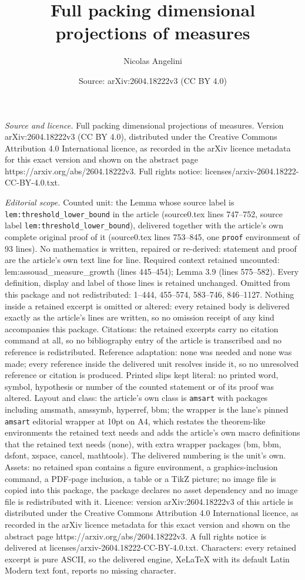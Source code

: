 \documentclass[10pt,a4paper]{amsart}
\title[Full packing dimensional projections of measures]{Full packing dimensional projections of measures}
\author{Nicolas Angelini}
\date{Source: arXiv:2604.18222v3 (CC BY 4.0)}
\begin{document}
\maketitle

\noindent\emph{Source and licence.} Full packing dimensional projections of measures. Version arXiv:2604.18222v3 (CC BY 4.0), distributed under the Creative Commons Attribution 4.0 International licence, as recorded in the arXiv licence metadata for this exact version and shown on the abstract page https://arxiv.org/abs/2604.18222v3. Full rights notice: licenses/arxiv-2604.18222-CC-BY-4.0.txt.\par\smallskip

\noindent\textit{Editorial scope.} Counted unit: the Lemma whose source label is \texttt{lem:threshold\_lower\_bound} in the article (source0.tex lines 747--752, source label \texttt{lem:threshold\_lower\_bound}), delivered together with the article's own complete original proof of it (source0.tex lines 753--845, one \texttt{proof} environment of 93 lines). No mathematics is written, repaired or re-derived: statement and proof are the article's own text line for line. Required context retained uncounted: lem:assouad\_measure\_growth (lines 445--454); Lemma 3.9 (lines 575--582). Every definition, display and label of those lines is retained unchanged. Omitted from this package and not redistributed: 1--444, 455--574, 583--746, 846--1127. Nothing inside a retained excerpt is omitted or altered: every retained body is delivered exactly as the article's lines are written, so no omission receipt of any kind accompanies this package. Citations: the retained excerpts carry no citation command at all, so no bibliography entry of the article is transcribed and no reference is redistributed. Reference adaptation: none was needed and none was made; every reference inside the delivered unit resolves inside it, so no unresolved reference or citation is produced. Printed slips kept literal: no printed word, symbol, hypothesis or number of the counted statement or of its proof was altered. Layout and class: the article's own class is \texttt{amsart} with packages including amsmath, amssymb, hyperref, bbm; the wrapper is the lane's pinned \texttt{amsart} editorial wrapper at 10pt on A4, which restates the theorem-like environments the retained text needs and adds the article's own macro definitions that the retained text needs (none), with extra wrapper packages (bm, bbm, dsfont, xspace, cancel, mathtools). The delivered numbering is the unit's own. Assets: no retained span contains a figure environment, a graphics-inclusion command, a PDF-page inclusion, a table or a TikZ picture; no image file is copied into this package, the package declares no asset dependency and no image file is redistributed with it. Licence: version arXiv:2604.18222v3 of this article is distributed under the Creative Commons Attribution 4.0 International licence, as recorded in the arXiv licence metadata for this exact version and shown on the abstract page https://arxiv.org/abs/2604.18222v3. A full rights notice is delivered at licenses/arxiv-2604.18222-CC-BY-4.0.txt. Characters: every retained excerpt is pure ASCII, so the delivered engine, XeLaTeX with its default Latin Modern text font, reports no missing character.
\end{document}

